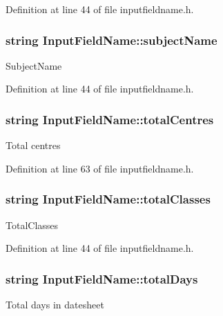 \-Definition at line 44 of file inputfieldname.\-h.

\hypertarget{classInputFieldName_a0614731b959afef6bb00f9fc957e7521}{
\subsubsection[{subject\-Name}]{\setlength{\rightskip}{0pt plus 5cm}string {\bf \-Input\-Field\-Name\-::subject\-Name}}}\label{dd/db2/classInputFieldName_a0614731b959afef6bb00f9fc957e7521}
\-Subject\-Name 

\-Definition at line 44 of file inputfieldname.\-h.

\hypertarget{classInputFieldName_af88ac102ec3a4adbb9edc7c3d61919cb}{
\subsubsection[{total\-Centres}]{\setlength{\rightskip}{0pt plus 5cm}string {\bf \-Input\-Field\-Name\-::total\-Centres}}}\label{dd/db2/classInputFieldName_af88ac102ec3a4adbb9edc7c3d61919cb}
\-Total centres 

\-Definition at line 63 of file inputfieldname.\-h.

\hypertarget{classInputFieldName_a5bf413dee6dcf29c1872e93f150d48c0}{
\subsubsection[{total\-Classes}]{\setlength{\rightskip}{0pt plus 5cm}string {\bf \-Input\-Field\-Name\-::total\-Classes}}}\label{dd/db2/classInputFieldName_a5bf413dee6dcf29c1872e93f150d48c0}
\-Total\-Classes 

\-Definition at line 44 of file inputfieldname.\-h.

\hypertarget{classInputFieldName_a12ba65660edd7f8f7ecf1e25893716da}{
\subsubsection[{total\-Days}]{\setlength{\rightskip}{0pt plus 5cm}string {\bf \-Input\-Field\-Name\-::total\-Days}}}\label{dd/db2/classInputFieldName_a12ba65660edd7f8f7ecf1e25893716da}
\-Total days in datesheet 


